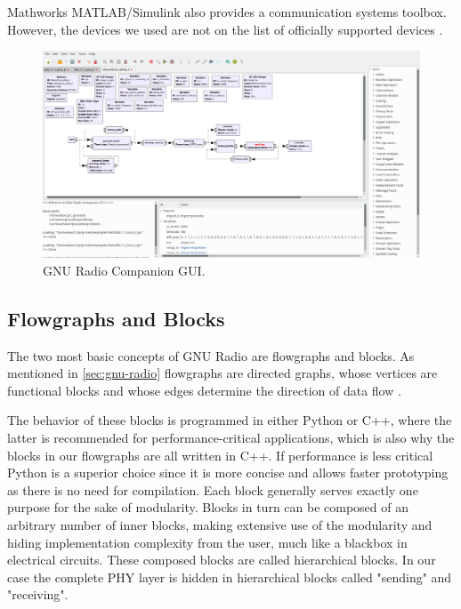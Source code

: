 Mathworks MATLAB/Simulink also provides a communication systems toolbox. However, the devices we used are not on the list of officially supported devices \cite{Matlab}.

\begin{figure}[t]
	\label{fig:gnuradio}
	\begin{center}
		\includegraphics[width=\textwidth,valign=c]{pictures/grc_ui}
	\end{center}
	\caption{GNU Radio Companion GUI.}
\end{figure}

\subsection{Flowgraphs and Blocks}
\label{sec:flowgraphs}
The two most basic concepts of GNU Radio are flowgraphs and blocks. As mentioned in \ref{sec:gnu-radio} flowgraphs are directed graphs, whose vertices are functional blocks and whose edges determine the direction of data flow \cite{GR1}. 

The behavior of these blocks is programmed in either Python or C++, where the latter is recommended for performance-critical applications, which is also why the blocks in our flowgraphs are all written in C++. If performance is less critical Python is a superior choice since it is more concise and allows faster prototyping as there is no need for compilation. Each block generally serves exactly one purpose for the sake of modularity. Blocks in turn can be composed of an arbitrary number of inner blocks, making extensive use of the modularity and hiding implementation complexity from the user, much like a blackbox in electrical circuits. These composed blocks are called hierarchical blocks. In our case the complete PHY layer is hidden in hierarchical blocks called "sending" and "receiving".

